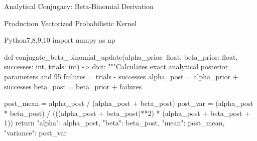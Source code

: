 
\begin{frame}{Analytical Conjugacy: Beta-Binomial Derivation}
  \vspace{.12cm}
\end{frame}

\begin{frame}[fragile]{Production Vectorized Probabilistic Kernel}
  \begin{HighlightedCodeBlock}[numbers=left]{Python}{7,8,9,10}
import numpy as np

def conjugate_beta_binomial_update(alpha_prior: float, beta_prior: float, 
                                   successes: int, trials: int) -> dict:
    """Calculates exact analytical posterior parameters and 95%
    failures = trials - successes
    alpha_post = alpha_prior + successes
    beta_post = beta_prior + failures
    
    post_mean = alpha_post / (alpha_post + beta_post)
    post_var = (alpha_post * beta_post) / (((alpha_post + beta_post)**2) * (alpha_post + beta_post + 1))
    return {"alpha": alpha_post, "beta": beta_post, "mean": post_mean, "variance": post_var}
  \end{HighlightedCodeBlock}
  \vspace{.10cm}
\end{frame}

